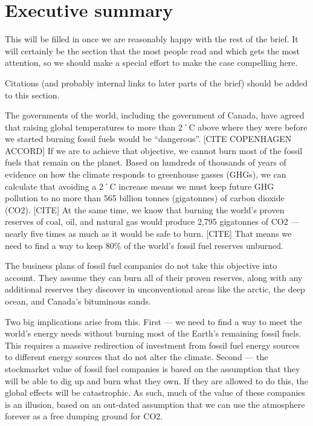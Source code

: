 
		\section{Executive summary}

\begin{vcom}
This will be filled in once we are reasonably happy with the rest of the brief. It will certainly be the section that the most people read and which gets the most attention, so we should make a special effort to make the case compelling here.
\end{vcom}


\begin{vcom}
	Citations (and probably internal links to later parts of the brief) should be added to this section.
\end{vcom}


The governments of the world, including the government of Canada, have agreed that raising global temperatures to more than 2˚C above where they were before we started burning fossil fuels would be ``dangerous''. [CITE COPENHAGEN ACCORD]
If we are to achieve that objective, we cannot burn most of the fossil fuels that remain on the planet.
Based on hundreds of thousands of years of evidence on how the climate responds to greenhouse gasses (GHGs), we can calculate that avoiding a 2˚C increase means we must keep future GHG pollution to no more than 565 billion tonnes (gigatonnes) of carbon dioxide (CO2). [CITE]
At the same time, we know that burning the world's proven reserves of coal, oil, and natural gas would produce 2,795 gigatonnes of CO2 --- nearly five times as much as it would be safe to burn. [CITE]
That means we need to find a way to keep 80\% of the world's fossil fuel reserves unburned.


The business plans of fossil fuel companies do not take this objective into account.
They assume they can burn all of their proven reserves, along with any additional reserves they discover in unconventional areas like the arctic, the deep ocean, and Canada's bituminous sands.



Two big implications arise from this. First --- we need to find a way to meet the world's energy needs without burning most of the Earth's remaining fossil fuels. 
This requires a massive redirection of investment from fossil fuel energy sources to different energy sources that do not alter the climate.
Second --- the stockmarket value of fossil fuel companies is based on the assumption that they will be able to dig up and burn what they own.
If they are allowed to do this, the global effects will be catastrophic.
As such, much of the value of these companies is an illusion, based on an out-dated assumption that we can use the atmosphere forever as a free dumping ground for CO2.



